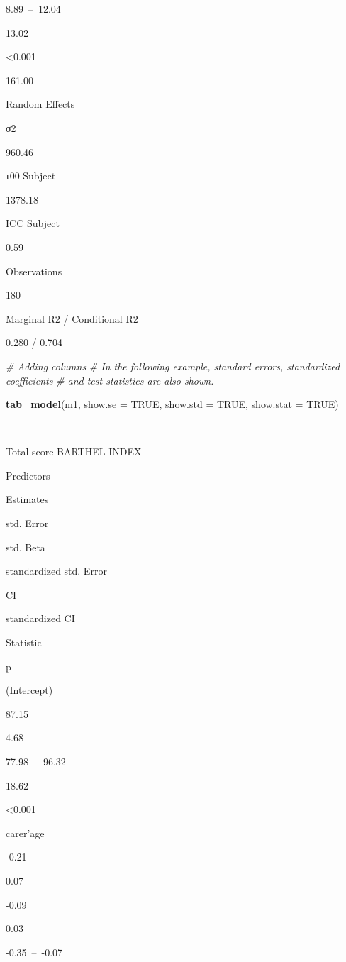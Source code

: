 \documentclass[]{article}
\newenvironment{Shaded}{\begin{snugshade}}{\end{snugshade}}
\newcommand{\KeywordTok}[1]{\textcolor[rgb]{0.13,0.29,0.53}{\textbf{#1}}}
\newcommand{\DataTypeTok}[1]{\textcolor[rgb]{0.13,0.29,0.53}{#1}}
\newcommand{\CommentTok}[1]{\textcolor[rgb]{0.56,0.35,0.01}{\textit{#1}}}
\newcommand{\OtherTok}[1]{\textcolor[rgb]{0.56,0.35,0.01}{#1}}
\newcommand{\NormalTok}[1]{#1}
\begin{document}
8.89~--~12.04

13.02

\textless{}0.001

161.00

Random Effects

σ2

960.46

τ00 Subject

1378.18

ICC Subject

0.59

Observations

180

Marginal R2 / Conditional R2

0.280 / 0.704

\begin{Shaded}
\begin{Highlighting}[]
\CommentTok{# Adding columns}
\CommentTok{# In the following example, standard errors, standardized coefficients }
\CommentTok{# and test statistics are also shown.}

\KeywordTok{tab_model}\NormalTok{(m1, }\DataTypeTok{show.se =} \OtherTok{TRUE}\NormalTok{, }\DataTypeTok{show.std =} \OtherTok{TRUE}\NormalTok{, }\DataTypeTok{show.stat =} \OtherTok{TRUE}\NormalTok{)}
\end{Highlighting}
\end{Shaded}

~

Total score BARTHEL INDEX

Predictors

Estimates

std. Error

std. Beta

standardized std. Error

CI

standardized CI

Statistic

p

(Intercept)

87.15

4.68

77.98~--~96.32

18.62

\textless{}0.001

carer'age

-0.21

0.07

-0.09

0.03

-0.35~--~-0.07
\end{document}
